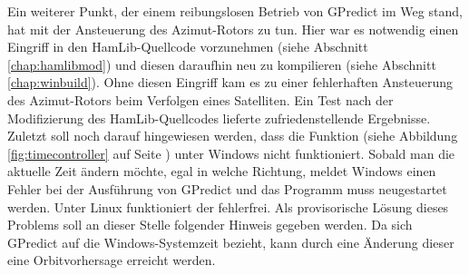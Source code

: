 Ein weiterer Punkt, der einem reibungslosen Betrieb von GPredict im Weg stand, hat mit der Ansteuerung des Azimut-Rotors zu tun. Hier war es notwendig einen Eingriff in den HamLib-Quellcode vorzunehmen (siehe Abschnitt \ref{chap:hamlibmod}) und diesen daraufhin neu zu kompilieren (siehe Abschnitt \ref{chap:winbuild}). Ohne diesen Eingriff kam es zu einer fehlerhaften Ansteuerung des Azimut-Rotors beim Verfolgen eines Satelliten. Ein Test nach der Modifizierung des HamLib-Quellcodes lieferte zufriedenstellende Ergebnisse.\newpar
Zuletzt soll noch darauf hingewiesen werden, dass die Funktion  (siehe Abbildung \ref{fig:timecontroller} auf Seite \pageref{fig:timecontroller}) unter Windows nicht funktioniert. Sobald man die aktuelle Zeit ändern möchte, egal in welche Richtung, meldet Windows einen Fehler bei der Ausführung von GPredict und das Programm muss neugestartet werden. Unter Linux funktioniert der  fehlerfrei. Als provisorische Lösung dieses Problems soll an dieser Stelle folgender Hinweis gegeben werden. Da sich GPredict auf die Windows-Systemzeit bezieht, kann durch eine Änderung dieser eine Orbitvorhersage erreicht werden.